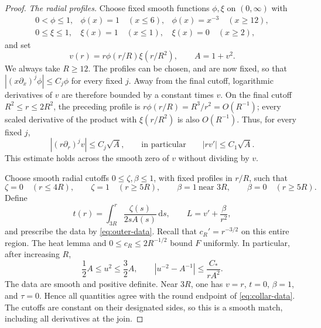 \begin{proof}
\emph{The radial profiles.}
Choose fixed smooth functions $\phi,\xi$ on $(0,\infty)$ with
\[
 \begin{array}{lll}
 0<\phi\leq1,&\phi(x)=1\quad(x\leq6),&
             \phi(x)=x^{-3}\quad(x\geq12),\\
 0\leq\xi\leq1,&\xi(x)=1\quad(x\leq1),&
             \xi(x)=0\quad(x\geq2),
 \end{array}
\]
and set
\begin{equation}\label{eq:bending-profile}
 v(r)=r\phi(r/R)\xi(r/R^2),\qquad A=1+v^2.
\end{equation}
We always take $R\geq12$. The profiles can be chosen, and are now
fixed, so that $|(x\partial_x)^j\phi|\leq C_j\phi$ for every fixed
$j$. Away from the final cutoff, logarithmic derivatives of $v$
are therefore bounded by a constant times $v$. On the final cutoff
$R^2\leq r\leq2R^2$, the preceding profile is
$r\phi(r/R)=R^3/r^2=O(R^{-1})$; every scaled derivative of the
product with $\xi(r/R^2)$ is also $O(R^{-1})$. Thus, for every
fixed $j$,
\begin{equation}\label{eq:profile-derivatives}
 |(r\partial_r)^jv|\leq C_j\sqrt A,
 \qquad\text{in particular}\qquad |rv'|\leq C_1\sqrt A.
\end{equation}
This estimate holds across the smooth zero of $v$ without dividing
by $v$.

Choose smooth radial cutoffs $0\leq\zeta,\beta\leq1$, with fixed
profiles in $r/R$, such that
\[
 \zeta=0\quad(r\leq4R),\qquad \zeta=1\quad(r\geq5R),
 \qquad
 \beta=1\ \text{near }3R,\qquad \beta=0\quad(r\geq5R).
\]
Define
\begin{equation}\label{eq:heat-time}
 t(r)=\int_{3R}^r\frac{\zeta(s)}{2sA(s)}\,\mathrm ds,
 \qquad L=v'+\frac{\beta}{r^2},
\end{equation}
and prescribe the data by \eqref{eq:outer-data}. Recall that
$c_R'=r^{-3/2}$ on this entire region. The heat lemma and
$0\leq c_R\leq2R^{-1/2}$ bound $F$ uniformly. In particular,
after increasing $R$,
\begin{equation}\label{eq:lapse-comparison}
 \frac12 A\leq u^2\leq\frac32 A,
 \qquad
 \left|u^{-2}-A^{-1}\right|\leq\frac{C_*}{rA^2}.
\end{equation}
The data are smooth and positive definite. Near $3R$, one has
$v=r$, $t=0$, $\beta=1$, and $\tau=0$. Hence all quantities agree
with the round endpoint of \eqref{eq:collar-data}. The cutoffs are
constant on their designated sides, so this is a smooth match,
including all derivatives at the join.


\end{proof}
